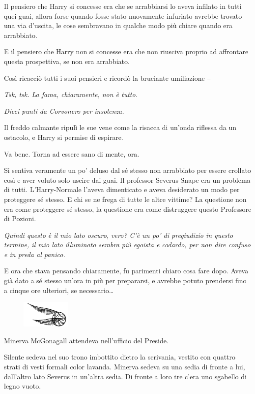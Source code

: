 Il pensiero che Harry si concesse era che se arrabbiarsi lo aveva infilato in tutti quei guai, allora forse quando fosse stato nuovamente infuriato avrebbe trovato una via d’uscita, le cose sembravano in qualche modo più chiare quando era arrabbiato.

E il pensiero che Harry non si concesse era che non riusciva proprio ad affrontare questa prospettiva, se non era arrabbiato.

Così ricacciò tutti i suoi pensieri e ricordò la bruciante umiliazione –

\textit{Tsk, tsk. La fama, chiaramente, non è tutto.}

\textit{Dieci punti da Corvonero per insolenza.}

Il freddo calmante ripulì le sue vene come la risacca di un’onda riflessa da un ostacolo, e Harry si permise di espirare.

Va bene. Torna ad essere sano di mente, ora.

Si sentiva veramente un po’ deluso dal sé stesso non arrabbiato per essere crollato così e aver voluto solo uscire dai guai. Il professor Severus Snape era un problema di tutti. L’Harry-Normale l’aveva dimenticato e aveva desiderato un modo per proteggere sé stesso. E chi se ne frega di tutte le altre vittime? La questione non era come proteggere sé stesso, la questione era come distruggere questo Professore di Pozioni.

\textit{Quindi questo è il mio lato oscuro, vero? C’è un po’ di pregiudizio in questo termine, il mio lato illuminato sembra più egoista e codardo, per non dire confuso e in preda al panico.}

E ora che stava pensando chiaramente, fu parimenti chiaro cosa fare dopo. Aveva già dato a sé stesso un’ora in più per prepararsi, e avrebbe potuto prendersi fino a cinque ore ulteriori, se necessario…

\begin{figure}[h!]
        \includegraphics[scale=0.4]{boccino.png}
        \centering
\end{figure}

Minerva McGonagall attendeva nell’ufficio del Preside.

Silente sedeva nel suo trono imbottito dietro la scrivania, vestito con quattro strati di vesti formali color lavanda. Minerva sedeva su una sedia di fronte a lui, dall’altro lato Severus in un’altra sedia. Di fronte a loro tre c’era uno sgabello di legno vuoto.

